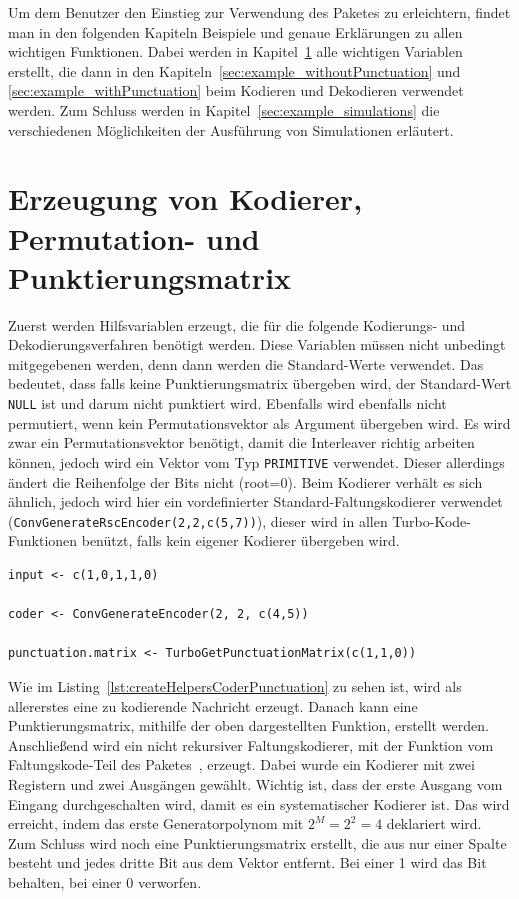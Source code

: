 Um dem Benutzer den Einstieg zur Verwendung des Paketes zu erleichtern, findet man in den folgenden Kapiteln Beispiele und genaue Erklärungen zu allen wichtigen Funktionen. Dabei werden in Kapitel~\ref{sec:example_createHelpers} alle wichtigen Variablen erstellt, die dann in den Kapiteln~\ref{sec:example_withoutPunctuation} und \ref{sec:example_withPunctuation} beim Kodieren und Dekodieren verwendet werden. Zum Schluss werden in Kapitel~\ref{sec:example_simulations} die verschiedenen Möglichkeiten der Ausführung von Simulationen erläutert.

\section{Erzeugung von Kodierer, Permutation- und Punktierungsmatrix}
\label{sec:example_createHelpers}
Zuerst werden Hilfsvariablen erzeugt, die für die folgende Kodierungs- und Dekodierungsverfahren benötigt werden. Diese Variablen müssen nicht unbedingt mitgegebenen werden, denn dann werden die Standard-Werte verwendet. Das bedeutet, dass falls keine Punktierungsmatrix übergeben wird, der Standard-Wert \texttt{NULL} ist und darum nicht punktiert wird. Ebenfalls wird ebenfalls nicht permutiert, wenn kein Permutationsvektor als Argument übergeben wird. Es wird zwar ein Permutationsvektor benötigt, damit die Interleaver richtig arbeiten können, jedoch wird ein Vektor vom Typ \texttt{PRIMITIVE} verwendet. Dieser allerdings ändert die Reihenfolge der Bits nicht (root=0). Beim Kodierer verhält es sich ähnlich, jedoch wird hier ein vordefinierter Standard-Faltungskodierer verwendet (\texttt{ConvGenerateRscEncoder(2,2,c(5,7))}), dieser wird in allen Turbo-Kode-Funktionen benützt, falls kein eigener Kodierer übergeben wird.

\begin{lstlisting}[caption=Erzeugung von Kodierer und Punktierungsmatrix, label={lst:createHelpersCoderPunctuation}, float=!th]
input <- c(1,0,1,1,0)

coder <- ConvGenerateEncoder(2, 2, c(4,5))

punctuation.matrix <- TurboGetPunctuationMatrix(c(1,1,0))
\end{lstlisting}

Wie im Listing~\ref{lst:createHelpersCoderPunctuation} zu sehen ist, wird als allererstes eine zu kodierende Nachricht erzeugt. Danach kann eine Punktierungsmatrix, mithilfe der oben dargestellten Funktion, erstellt werden. Anschließend wird ein nicht rekursiver Faltungskodierer, mit der Funktion vom Faltungskode-Teil des Paketes~\cite[S. 53 f.]{nocker}, erzeugt. Dabei wurde ein Kodierer mit zwei Registern und zwei Ausgängen gewählt. Wichtig ist, dass der erste Ausgang vom Eingang durchgeschalten wird, damit es ein systematischer Kodierer ist. Das wird erreicht, indem das erste Generatorpolynom mit $2^M = 2^2 = 4$ deklariert wird. Zum Schluss wird noch eine Punktierungsmatrix erstellt, die aus nur einer Spalte besteht und jedes dritte Bit aus dem Vektor entfernt. Bei einer 1 wird das Bit behalten, bei einer 0 verworfen.

